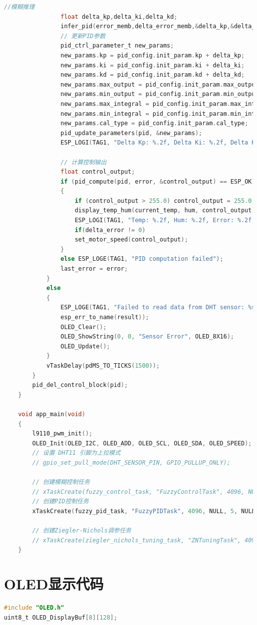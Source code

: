 \documentclass[UTF8]{ctexart}
\begin{document}
\begin{appendices}
\begin{lstlisting}[language=C, caption={main.c}]
				//模糊推理
				float delta_kp,delta_ki,delta_kd;
				infer_pid(error_memb,delta_error_memb,&delta_kp,&delta_ki,&delta_kd);
				// 更新PID参数
				pid_ctrl_parameter_t new_params;
				new_params.kp = pid_config.init_param.kp + delta_kp;
				new_params.ki = pid_config.init_param.ki + delta_ki;
				new_params.kd = pid_config.init_param.kd + delta_kd;
				new_params.max_output = pid_config.init_param.max_output;
				new_params.min_output = pid_config.init_param.min_output;
				new_params.max_integral = pid_config.init_param.max_integral;
				new_params.min_integral = pid_config.init_param.min_integral;
				new_params.cal_type = pid_config.init_param.cal_type;
				pid_update_parameters(pid, &new_params);
				ESP_LOGI(TAG1, "Delta Kp: %.2f, Delta Ki: %.2f, Delta Kd: %.2f", delta_kp, delta_ki, delta_kd);
				
				// 计算控制输出
				float control_output;
				if (pid_compute(pid, error, &control_output) == ESP_OK)
				{
					if (control_output > 255.0) control_output = 255.0;
					display_temp_hum(current_temp, hum, control_output);
					ESP_LOGI(TAG1, "Temp: %.2f, Hum: %.2f, Error: %.2f, Control Output: %.2f", current_temp, hum, error, control_output);
					if(delta_error != 0)
					set_motor_speed(control_output);
				}
				else ESP_LOGE(TAG1, "PID computation failed");
				last_error = error;
			}
			else
			{
				ESP_LOGE(TAG1, "Failed to read data from DHT sensor: %s",
				esp_err_to_name(result));
				OLED_Clear();
				OLED_ShowString(0, 0, "Sensor Error", OLED_8X16);
				OLED_Update();
			}
			vTaskDelay(pdMS_TO_TICKS(1500));
		}
		pid_del_control_block(pid);
	}

	void app_main(void)
	{
		l9110_pwm_init();
		OLED_Init(OLED_I2C, OLED_ADD, OLED_SCL, OLED_SDA, OLED_SPEED);
		// 设置 DHT11 引脚为上拉模式
		// gpio_set_pull_mode(DHT_SENSOR_PIN, GPIO_PULLUP_ONLY);
		
		// 创建模糊控制任务
		// xTaskCreate(fuzzy_control_task, "FuzzyControlTask", 4096, NULL, 5, NULL);
		// 创建PID控制任务
		xTaskCreate(fuzzy_pid_task, "FuzzyPIDTask", 4096, NULL, 5, NULL);
		
		// 创建Ziegler-Nichols调参任务
		// xTaskCreate(ziegler_nichols_tuning_task, "ZNTuningTask", 4096, NULL, 5, NULL);
	}
\end{lstlisting}
\newpage
\section{OLED显示代码}
\begin{lstlisting}[language=C, caption=OLED.c]
#include "OLED.h"
uint8_t OLED_DisplayBuf[8][128];


\end{lstlisting}
\end{appendices}
\end{document}
